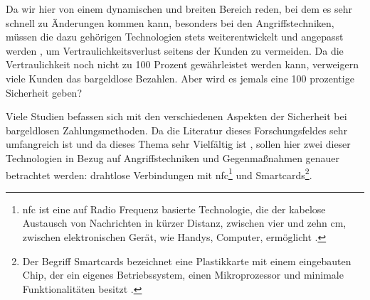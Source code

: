 Da wir hier von einem dynamischen und breiten Bereich reden, bei dem es sehr schnell zu Änderungen kommen kann, 
besonders bei den Angriffstechniken, müssen die dazu gehörigen Technologien stets weiterentwickelt und angepasst
werden \cite{refip:NYRS}, um Vertraulichkeitsverlust seitens der Kunden zu vermeiden. Da die Vertraulichkeit noch
nicht zu 100 Prozent gewährleistet werden kann, verweigern viele Kunden das bargeldlose Bezahlen. Aber
wird es jemals eine 100 prozentige Sicherheit geben?

Viele Studien befassen sich mit den verschiedenen Aspekten der Sicherheit bei bargeldlosen Zahlungsmethoden.
Da die Literatur dieses Forschungsfeldes sehr umfangreich ist und da dieses Thema sehr Vielfältig ist 
\cite{refip:GMPS}, sollen hier zwei dieser Technologien in Bezug auf Angriffstechniken und Gegenmaßnahmen 
genauer betrachtet werden: drahtlose Verbindungen mit \acrfull{nfc}\footnote{\acrfull{nfc} ist eine auf Radio Frequenz
basierte Technologie, die der kabelose Austausch von Nachrichten in kürzer Distanz, zwischen vier und zehn cm, 
zwischen elektronischen Gerät, wie Handys, Computer, ermöglicht \cite{refart:NFNK}.} und Smartcards\footnote{Der
Begriff Smartcards bezeichnet eine Plastikkarte mit einem eingebauten Chip, der ein eigenes Betriebssystem, 
einen Mikroprozessor und minimale Funktionalitäten besitzt \cite{refip:JFSB}.}.


